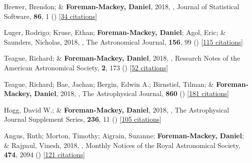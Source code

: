 \item[{\color{numcolor}\scriptsize38}] Brewer, Brendon; \& \textbf{Foreman-Mackey, Daniel}, 2018, , Journal of Statistical Software, \textbf{86}, 1 () [\href{https://scholar.google.com/scholar?cites=789224875040810871}{34 citations}]

\item[{\color{numcolor}\scriptsize37}] Luger, Rodrigo; Kruse, Ethan; \textbf{Foreman-Mackey, Daniel}; Agol, Eric; \& Saunders, Nicholas, 2018, , The Astronomical Journal, \textbf{156}, 99 () [\href{https://ui.adsabs.harvard.edu/abs/2018AJ....156...99L}{115 citations}]

\item[{\color{numcolor}\scriptsize36}] Teague, Richard; \& \textbf{Foreman-Mackey, Daniel}, 2018, , Research Notes of the American Astronomical Society, \textbf{2}, 173 () [\href{https://ui.adsabs.harvard.edu/abs/2018RNAAS...2..173T}{52 citations}]

\item[{\color{numcolor}\scriptsize35}] Teague, Richard; Bae, Jaehan; Bergin, Edwin A.; Birnstiel, Tilman; \& \textbf{Foreman-Mackey, Daniel}, 2018, , The Astrophysical Journal, \textbf{860} () [\href{https://ui.adsabs.harvard.edu/abs/2018ApJ...860L..12T}{181 citations}]

\item[{\color{numcolor}\scriptsize34}] Hogg, David W.; \& \textbf{Foreman-Mackey, Daniel}, 2018, , The Astrophysical Journal Supplement Series, \textbf{236}, 11 () [\href{https://ui.adsabs.harvard.edu/abs/2018ApJS..236...11H}{105 citations}]

\item[{\color{numcolor}\scriptsize33}] Angus, Ruth; Morton, Timothy; Aigrain, Suzanne; \textbf{Foreman-Mackey, Daniel}; \& Rajpaul, Vinesh, 2018, , Monthly Notices of the Royal Astronomical Society, \textbf{474}, 2094 () [\href{https://ui.adsabs.harvard.edu/abs/2018MNRAS.474.2094A}{121 citations}]


